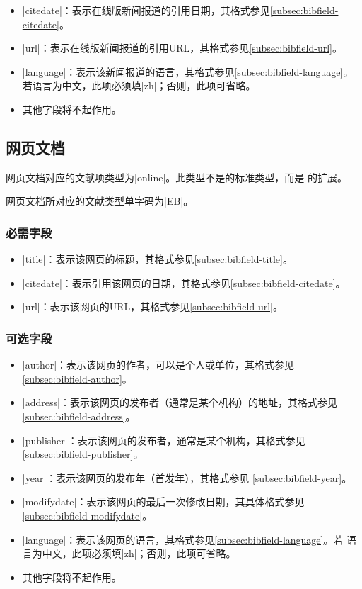\begin{itemize}
\item |citedate|：表示在线版新闻报道的引用日期，其格式参见\ref{subsec:bibfield-citedate}。
\item |url|：表示在线版新闻报道的引用URL，其格式参见\ref{subsec:bibfield-url}。
\item |language|：表示该新闻报道的语言，其格式参见\ref{subsec:bibfield-language}。
  若语言为中文，此项必须填|zh|；否则，此项可省略。
\item 其他字段将不起作用。
\end{itemize}

\subsection{网页文档}\label{subsec:bibtype-webpage}

网页文档对应的{\BibTeX}文献项类型为|online|。此类型不是{\BibTeX}的标准类型，而是
{\njuthesis}的扩展。

网页文档所对应的文献类型\cite{gbt3469-1983}单字码为|EB|。

\subsubsection{必需字段}

\begin{itemize}
\item |title|：表示该网页的标题，其格式参见\ref{subsec:bibfield-title}。
\item |citedate|：表示引用该网页的日期，其格式参见\ref{subsec:bibfield-citedate}。
\item |url|：表示该网页的URL，其格式参见\ref{subsec:bibfield-url}。
\end{itemize}

\subsubsection{可选字段}

\begin{itemize}
\item |author|：表示该网页的作者，可以是个人或单位，其格式参见
  \ref{subsec:bibfield-author}。
\item |address|：表示该网页的发布者（通常是某个机构）的地址，其格式参见
  \ref{subsec:bibfield-address}。
\item |publisher|：表示该网页的发布者，通常是某个机构，其格式参见
  \ref{subsec:bibfield-publisher}。
\item |year|：表示该网页的发布年（首发年），其格式参见
  \ref{subsec:bibfield-year}。
\item |modifydate|：表示该网页的最后一次修改日期，其具体格式参见
  \ref{subsec:bibfield-modifydate}。
\item |language|：表示该网页的语言，其格式参见\ref{subsec:bibfield-language}。若
  语言为中文，此项必须填|zh|；否则，此项可省略。
\item 其他字段将不起作用。
\end{itemize}

